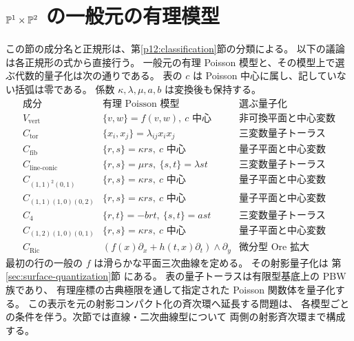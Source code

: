 \section{\texorpdfstring{$\mathbb P^1\times\mathbb P^2$}{P1 x P2} の一般元の有理模型}
\label{sec:p1p2-rational-models}\label{sec:p1p2-models}

この節の成分名と正規形は、第\ref{p12:classification}節の分類による。
以下の議論は各正規形の式から直接行う。
一般元の有理 Poisson 模型と、その模型上で選ぶ代数的量子化は次の通りである。
表の $c$ は Poisson 中心に属し、記していない括弧は零である。
係数 $\kappa,\lambda,\mu,a,b$ は変換後も保持する。
\[
\begin{array}{c|l|l}
\text{成分}&\text{有理 Poisson 模型}&\text{選ぶ量子化}\\\hline
V_{\mathrm{vert}}&\{v,w\}=f(v,w),\ c\text{ 中心}
 &\text{非可換平面と中心変数}\\
C_{\mathrm{tor}}&\{x_i,x_j\}=\lambda_{ij}x_ix_j
 &\text{三変数量子トーラス}\\
C_{\mathrm{fib}}&\{r,s\}=\kappa rs,\ c\text{ 中心}
 &\text{量子平面と中心変数}\\
C_{\mathrm{line\text{-}conic}}&\{r,s\}=\mu rs,\ \{s,t\}=\lambda st
 &\text{三変数量子トーラス}\\
C_{(1,1)^2(0,1)}&\{r,s\}=\kappa rs,\ c\text{ 中心}
 &\text{量子平面と中心変数}\\
C_{(1,1)(1,0)(0,2)}&\{r,s\}=\kappa rs,\ c\text{ 中心}
 &\text{量子平面と中心変数}\\
C_4&\{r,t\}=-b rt,\ \{s,t\}=a st
 &\text{三変数量子トーラス}\\
C_{(1,2)(1,0)(0,1)}&\{r,s\}=\kappa rs,\ c\text{ 中心}
 &\text{量子平面と中心変数}\\
C_{\mathrm{Ric}}&
 (f(x)\partial_x+h(t,x)\partial_t)\wedge\partial_y
 &\text{微分型 Ore 拡大}
\end{array}
\]
最初の行の一般の $f$ は滑らかな平面三次曲線を定める。
その射影量子化は 第\ref{sec:surface-quantization}節 にある。
表の量子トーラスは有限型基底上の PBW 族であり、
有理座標の古典極限を通して指定された Poisson 関数体を量子化する。
この表示を元の射影コンパクト化の斉次環へ延長する問題は、
各模型ごとの条件を伴う。次節では直線・二次曲線型について
両側の射影斉次環まで構成する。

